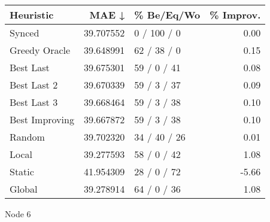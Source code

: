 \begin{tabular}{lrlr}
\toprule
      Heuristic &      MAE ↓ &    \% Be/Eq/Wo & \% Improv. \\
\midrule
         Synced &  39.707552 &   0 / 100 / 0 &      0.00 \\
  Greedy Oracle &  39.648991 &   62 / 38 / 0 &      0.15 \\
      Best Last &  39.675301 &   59 / 0 / 41 &      0.08 \\
    Best Last 2 &  39.670339 &   59 / 3 / 37 &      0.09 \\
    Best Last 3 &  39.668464 &   59 / 3 / 38 &      0.10 \\
 Best Improving &  39.667872 &   59 / 3 / 38 &      0.10 \\
         Random &  39.702320 &  34 / 40 / 26 &      0.01 \\
          Local &  39.277593 &   58 / 0 / 42 &      1.08 \\
         Static &  41.954309 &   28 / 0 / 72 &     -5.66 \\
         Global &  39.278914 &   64 / 0 / 36 &      1.08 \\
\bottomrule
\end{tabular}
\caption{Node 6}
\label{tab:non_lr001_le1_bs2_6}
